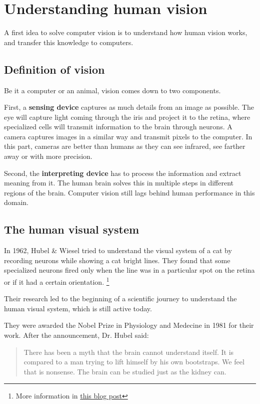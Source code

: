\documentclass{article}
\begin{document}
\section{Understanding human vision} \label{solving}
A first idea to solve computer vision is to understand how human vision works, and transfer this knowledge to computers.

\subsection{Definition of vision}
Be it a computer or an animal, vision comes down to two components.

First, a \textbf{sensing device} captures as much details from an image as possible. The eye will capture light coming through the iris and project it to the retina, where specialized cells will transmit information to the brain through neurons. A camera captures images in a similar way and transmit pixels to the computer. In this part, cameras are better than humans as they can see infrared, see farther away or with more precision.

Second, the \textbf{interpreting device} has to process the information and extract meaning from it. The human brain solves this in multiple steps in different regions of the brain. Computer vision still lags behind human performance in this domain.

\subsection{The human visual system}

In 1962, Hubel \& Wiesel \cite{hubel} tried to understand the visual system of a cat by recording neurons while showing a cat bright lines. They found that some specialized neurons fired only when the line was in a particular spot on the retina or if it had a certain orientation.
\footnote{More information in \href{http://knowingneurons.com/2014/10/29/hubel-and-wiesel-the-neural-basis-of-visual-perception/}{this blog post}}

Their research led to the beginning of a scientific journey to understand the human visual system, which is still active today.

They were awarded the Nobel Prize in Physiology and Medecine in 1981 for their work. After the announcement, Dr. Hubel said:
\begin{quote}
There has been a myth that the brain cannot understand itself.  It is compared to a man trying to lift himself by his own bootstraps.  We feel that is nonsense.  The brain can be studied just as the kidney can.
\end{quote}
\end{document}

